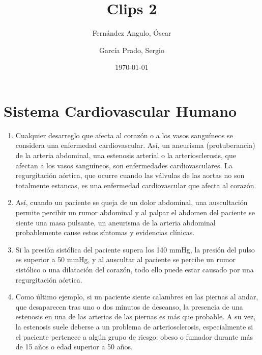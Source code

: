 \documentclass[10pt, a4paper,spanish]{article}
\title{\vspace{-15mm}\fontsize{24pt}{10pt}\selectfont\textbf{Clips 2}} %
\author{
	Fernández Angulo, Óscar \\
	\and
	García Prado, Sergio
}
\date{\today}
\begin{document}
	\maketitle %

	\thispagestyle{fancy} %



	\section{Sistema Cardiovascular Humano}

		\begin{enumerate}

			\item Cualquier desarreglo que afecta al corazón o a los vasos sanguíneos se considera una enfermedad cardiovascular. Así, un aneurisma (protuberancia) de la arteria abdominal, una estenosis arterial o la arteriosclerosis, que afectan a los vasos sanguíneos, son enfermedades cardiovasculares. La regurgitación aórtica, que ocurre cuando las válvulas de las aortas no son totalmente estancas, es una enfermedad cardiovascular que afecta al corazón.

			\item Así, cuando un paciente se queja de un dolor abdominal, una auscultación permite percibir un rumor abdominal y al palpar el abdomen del paciente se siente una masa pulsante, un aneurisma de la arteria abdominal probablemente cause estos síntomas y evidencias clínicas.

			\item Si la presión sistólica del paciente supera los 140 mmHg, la presión del pulso es superior a 50 mmHg, y al auscultar al paciente se percibe un rumor sistólico o una dilatación del corazón, todo ello puede estar causado por una regurgitación aórtica.

			\item Como último ejemplo, si un paciente siente calambres en las piernas al andar, que desaparecen tras uno o dos minutos de descanso, la presencia de una estenosis en una de las arterias de las piernas es más que probable. A su vez, la estenosis suele deberse a un problema de arteriosclerosis, especialmente si el paciente pertenece a algún grupo de riesgo: obeso o fumador durante más de 15 años o edad superior a 50 años.

		\end{enumerate}
\end{document}
